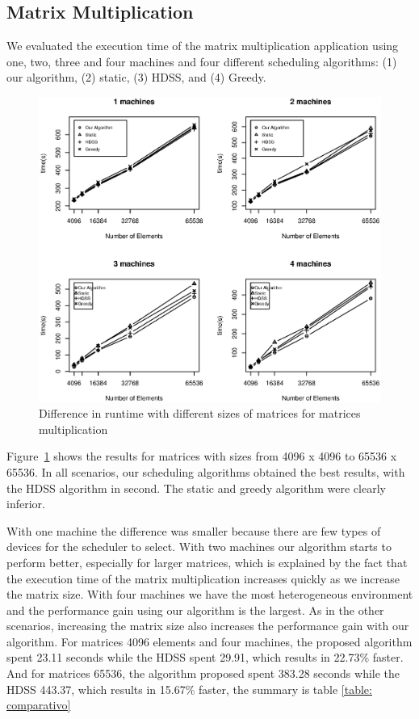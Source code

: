 \documentclass[journal]{IEEEtran}
\begin{document}

\subsection{Matrix Multiplication}

We evaluated the execution time of the matrix multiplication application using
one, two, three and four machines and four different scheduling algorithms: (1) our
algorithm, (2) static, (3) HDSS, and (4) Greedy. 

\begin{figure}[htb]
	\begin{center}
	\centering
			\includegraphics[scale=0.45]{GraficoMatrizesNovo.eps}
	\caption{Difference in runtime with different sizes of matrices for matrices multiplication}
	\label{fig:todosJuntos}
	\end{center}
\end{figure}


Figure~\ref{fig:todosJuntos} shows the results for matrices with sizes from
4096 x 4096 to 65536 x 65536. In all scenarios, our scheduling algorithms
obtained the best results, with the HDSS algorithm in second. The static and
greedy algorithm were clearly inferior.

With one machine the difference was smaller because there are few types of
devices for the scheduler to select. With two machines our algorithm starts to
perform better, especially for larger matrices, which is explained by the fact
that the execution time of the matrix multiplication increases quickly as we
increase the matrix size. With four machines we have the most heterogeneous
environment and the performance gain using our algorithm is the largest. As in
the other scenarios, increasing the matrix size also increases the performance
gain with our algorithm. For matrices 4096 elements and four machines, the proposed algorithm spent 23.11 seconds while the HDSS spent 29.91, which results in 22.73\% faster. And for matrices 65536, the algorithm proposed spent 383.28 seconds while the HDSS 443.37, which results in  15.67\% faster,  the summary is table \ref{table: comparativo}
\end{document}

